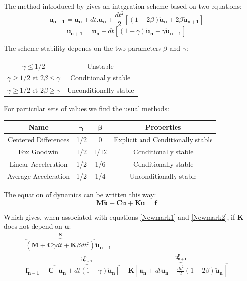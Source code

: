 \documentclass[12pt,a4paper]{article}
\begin{document}
The method introduced by \cite{Newmark} gives an integration scheme based on two equations:
\begin{equation}
\label{Newmark1}
	\mathbf{u_{n+1}} = \mathbf{u_n} + dt.\mathbf{\dot{u}_n}
	+ \frac{dt^2}{2}[(1-2\beta)\mathbf{\ddot{u}_n} + 2\beta\mathbf{\ddot{u}_{n+1}}]
\end{equation}
\begin{equation}
\label{Newmark2}
	\mathbf{\dot{u}_{n+1}} = \mathbf{\dot{u}_n} 
	+ dt[(1-\gamma)\mathbf{\ddot{u}_n} + \gamma \mathbf{\ddot{u}_{n+1}}]
\end{equation}

\noindent
The scheme stability depends on the two parameters $\beta$ and $\gamma$:
\begin{center}
\begin{tabular}{c c}
$\gamma \leq 1/2$
& Unstable\\
$\gamma \geq 1/2 \text{ et } 2 \beta \leq \gamma$
& Conditionally stable\\
$\gamma \geq 1/2 \text{ et } 2 \beta \geq \gamma$
& Unconditionally stable\\
\end{tabular}
\end{center}

\noindent
For particular sets of values we find the usual methods:
\begin{center}
\begin{tabular}{c c c c}
\textbf{Name} & $\boldsymbol{\gamma}$ & $\boldsymbol{\beta}$ & \textbf{Properties}\\
\hline
Centered Differences&1/2&0&Explicit and Conditionally stable\\
Fox Goodwin&1/2&1/12&Conditionally stable\\
Linear Acceleration&1/2&1/6&Conditionally stable\\
Average Acceleration&1/2&1/4&Unconditionally stable\\
\end{tabular}
\end{center}

\noindent
The equation of dynamics can be written this way:
\begin{equation}
	\mathbf{M} \mathbf{\ddot{u}} + \mathbf{C} \mathbf{\dot{u}} + \mathbf{K} \mathbf{u} = \mathbf{f}
\end{equation}

\noindent
Which gives, when associated with equations \ref{Newmark1} and \ref{Newmark2}, if $\mathbf{K}$ does not depend on $\mathbf{u}$:
\begingroup\small
\begin{equation}
	\begin{array}{c}
	\overbrace{(\mathbf{M}+\mathbf{C} \gamma dt + \mathbf{K}\beta dt^2)}^{\mathbf{S}} \mathbf{\ddot{u}_{n+1}} 
	= 
	\\
	\mathbf{f_{n+1}} 
	- \mathbf{C}\overbrace	{
						[\mathbf{\dot{u}_n} + dt (1-\gamma) \mathbf{\ddot{u}_n}]
					}
					^{\mathbf{\dot{u}^p_{n+1}}}
	-\mathbf{K}\overbrace	{
						[\mathbf{u_n} + dt \mathbf{\dot{u}_n} 
						 + \frac{dt^2}{2} (1-2\beta) \mathbf{\ddot{u}_n}]
					}
					^{\mathbf{u^p_{n+1}}}
	\end{array}
\end{equation}
\endgroup
\end{document}
